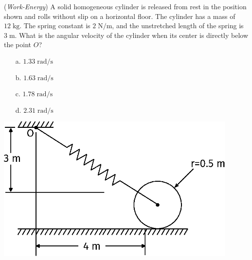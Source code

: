 \documentclass[addpoints, 12pt]{exam}
\begin{document}
\begin{questions}
\begin{minipage}{0.5\textwidth}
\question(\textit{Work-Energy})
A solid homogeneous cylinder is released from rest in the position shown and 
rolls without slip on a horizontal floor. The cylinder has a mass of $12 \; 
\unit{\kilo\gram}$. The spring constant is $2 \; \unit{\newton\per\meter}$, and 
the unstretched length of the spring is $3 \; \unit{\meter}$. What is the 
angular velocity of the cylinder when its center is directly below the point
$O$? \\[0.5ex]

\begin{minipage}{0.45\textwidth}
    \begin{center}
    \begin{itemize}
        \setlength\itemsep{-0.4em}
        \item[a.] $1.33 \; \unit{\radian\per\second}$
        \item[b.] $1.63 \; \unit{\radian\per\second}$
    \end{itemize}
    \end{center}
\end{minipage}
\begin{minipage}{0.45\textwidth}
    \begin{center}
    \begin{itemize}
        \setlength\itemsep{-0.4em}
        \item[c.] $1.78 \; \unit{\radian\per\second}$
        \item[d.] $2.31 \; \unit{\radian\per\second}$
    \end{itemize}
    \end{center}
\end{minipage}

\end{minipage}
%
\begin{minipage}{0.5\textwidth}
    \centering
    \includegraphics[width=0.9\textwidth,valign=c]{./figures/question7.eps}
\end{minipage}


\end{questions}
\end{document}

